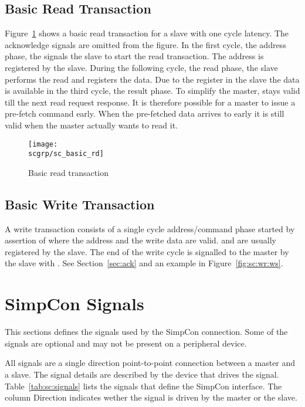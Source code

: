\subsection{Basic Read Transaction}

Figure~\ref{fig:sc:basic:rd} shows a basic read transaction for a
slave with one cycle latency. The acknowledge signals are omitted
from the figure. In the first cycle, the address phase, the
 signals the slave to start the read transaction. The
address is registered by the slave. During the following cycle, the
read phase, the slave performs the read and registers the data. Due
to the register in the slave the data is available in the third
cycle, the result phase. To simplify the master, 
stays valid till the next read request response. It is therefore
possible for a master to issue a pre-fetch command early. When the
pre-fetched data arrives to early it is still valid when the master
actually wants to read it.

\begin{figure}
    \centering
    \texttt{[image: \\scgrp/sc\_basic\_rd]}
    \caption{Basic read transaction}
    \label{fig:sc:basic:rd}
\end{figure}

\subsection{Basic Write Transaction}

A write transaction consists of a single cycle address/command phase
started by assertion of  where the address and the write
data are valid.  and  are usually
registered by the slave. The end of the write cycle is signalled to
the master by the slave with . See
Section~\ref{sec:ack} and an example in Figure~\ref{fig:sc:wr:ws}.

\section{SimpCon Signals}

This sections defines the signals used by the SimpCon connection.
Some of the signals are optional and may not be present on a
peripheral device.

All signals are a single direction point-to-point connection between
a master and a slave. The signal details are described by the device
that drives the signal. Table~\ref{tab:sc:signals} lists the signals
that define the SimpCon interface. The column Direction indicates
wether the signal is driven by the master or the slave.

